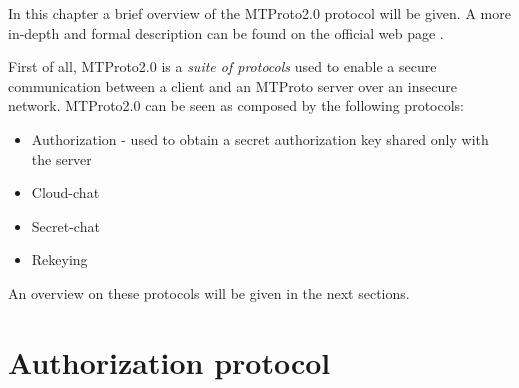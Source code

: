 
In this chapter a brief overview of the MTProto2.0 protocol will be given. A more in-depth and formal description can be found on the official web page \cite{Telegram-MTProto2.0}.

First of all, MTProto2.0 is a \textit{suite of protocols} used to enable a secure communication between a client and an MTProto server over an insecure network. MTProto2.0 can be seen as composed by the following protocols:

\begin{itemize}
    \item{Authorization - used to obtain a secret authorization key shared only with the server}
    \item{Cloud-chat}
    \item{Secret-chat}
    \item{Rekeying}
\end{itemize}

An overview on these protocols will be given in the next sections.

\section{Authorization protocol}

